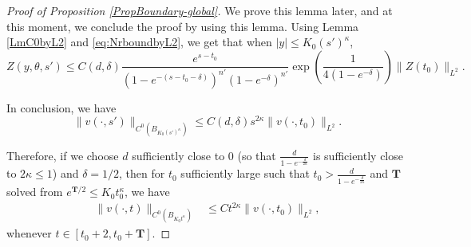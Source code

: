 \documentclass[11pt]{amsart}
\numberwithin{equation}{section}
\numberwithin{equation}{section}
\begin{document}
\begin{proof}[Proof of Proposition \ref{PropBoundary-global}]
		We prove this lemma later, and at this moment, we conclude the proof by using this lemma. Using Lemma \ref{LmC0byL2} and \eqref{eq:NrboundbyL2}, we get that when $|y|\leq K_0(s')^{\kappa}$,
		\begin{equation}\label{EqC0byL2}
			Z(y,\theta,s')
			\leq
			C(d,\delta)\frac{e^{s-t_0}}{(1-e^{-(s-t_0-\delta)})^{n'}(1-e^{-\delta})^{n'}}
			\exp\left(\frac{1}{4(1-e^{-\delta})}\right)\|Z(t_0)\|_{L^2}.
		\end{equation}
		
		
		In conclusion, we have
		\begin{equation}
			\|v(\cdot,s')\|_{C^0(B_{K_0(s')^{\kappa}})}
			\leq C(d,\delta)s^{2\kappa}\|v(\cdot,t_0)\|_{L^2}.
		\end{equation}
		
		Therefore, if we choose $d$ sufficiently close to $0$ (so that $\frac{d}{1-e^{-\frac{d}{2\kappa}}}$ is sufficiently close to $2\kappa\leq 1$) and $\delta=1/2$, then for $t_0$ sufficiently large such that $t_0>\frac{d}{1-e^{-\frac{d}{2\kappa}}}$ and $\mathbf T$ solved from $e^{\mathbf{T}/2}\leq K_0 t_0^\kappa$, we have \begin{equation*}
			\begin{aligned}
				\|v(\cdot,t)\|_{C^0(B_{K_0t^{\kappa}})}
				&\leq C t^{2\kappa}\|v(\cdot,t_0)\|_{L^2},
			\end{aligned}
		\end{equation*}
		whenever $t\in[t_0+2,t_0+\mathbf T]$.
		
		
	\end{proof}
\end{document}
